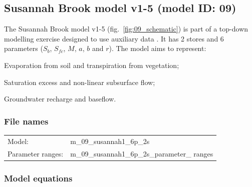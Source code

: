 \subsection{ Susannah Brook model v1-5 (model ID: 09)}
The Susannah Brook model v1-5 (fig.~\ref{fig:09_schematic}) is part of a top-down modelling exercise designed to use auxiliary data \citep{Son2007}. It has 2 stores and 6 parameters ($S_b$, $S_{fc}$, $M$, $a$, $b$ and $r$). The model aims to represent:

\begin{itemizecompact}
\item Evaporation from soil and transpiration from vegetation;
\item Saturation excess and non-linear subsurface flow;
\item Groundwater recharge and baseflow.
\end{itemizecompact}

\subsubsection{File names}
\begin{tabular}{@{}ll}
Model: &m\_09\_susannah1\_6p\_2s \\
Parameter ranges: &m\_09\_susannah1\_6p\_2s\_parameter\_ ranges \\
\end{tabular}

\subsubsection{Model equations}

